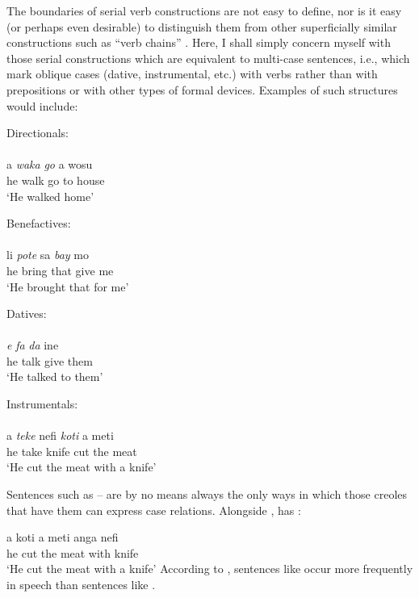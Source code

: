 The boundaries of serial verb constructions are not easy to define, nor is it easy (or perhaps even desirable) to distinguish them from other superficially similar constructions such as ``verb chains'' \citep{Forman1972}. Here, I shall simply concern myself with those serial constructions which are equivalent to multi-case sentences, i.e., which mark oblique cases (dative, instrumental, etc.) with verbs rather than with prepositions or with other types of formal devices. Examples of such structures would include:

\ea\label{ex:2:223}
Directionals:\\
\ili{\langSR}{}{}\\
\gll a \emph{waka} \emph{go} a wosu\\
he walk go to house \\
\glt `He walked home'
\z

\ea\label{ex:2:224}
Benefactives:\\
\ili{\langGU}{}{}\\
\gll li \emph{pote} sa \emph{bay} mo\\
he bring that give me\\
\glt `He brought that for me'
\z

\ea\label{ex:2:225}
Datives:\\
\ili{\langST}{}{}\\
\gll \emph{e} \emph{fa} \emph{da} ine \\
he talk give them \\
\glt `He talked to them'
\z

\ea\label{ex:2:226}
Instrumentals:\\
\\
\gll a \emph{teke} nefi \emph{koti} a meti \\
he take knife cut the meat\\
\glt `He cut the meat with a knife'
\z

Sentences such as -- are by no means always the only ways in which those creoles that have them can express case relations. Alongside ,  has :

\ea\label{ex:2:227}
\gll a koti a meti anga nefi\\
he cut the meat with knife\\
\glt `He cut the meat with a knife' 
\z
According to \citet{Huttar1975}, sentences like  occur more fre\-quently in speech than sentences like .

